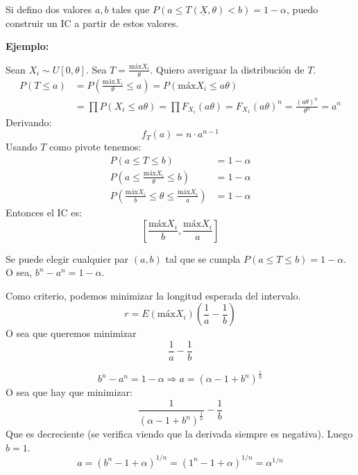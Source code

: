 \begin{enumerate}
		Si defino dos valores $a,b$ tales que $P(a \leq T(\underline X, \theta) < b) = 1-\alpha$, puedo construir un IC a partir de estos valores.

		\textbf{Ejemplo:}

		Sean $X_i\sim U[0,\theta]$. Sea $T = \frac{\text{máx}X_i}{\theta}$.
		Quiero averiguar la distribución de $T$.
		\begin{align*}
			P(T \leq a)	& = P\left(\frac{\text{máx}X_i}{\theta} \leq a\right) = P(\text{máx}X_i \leq a\theta)	\\
						& = \prod P(X_i \leq a\theta) = \prod F_{X_i}(a\theta) = F_{X_1}(a\theta)^n = \frac{(a\theta)^n}{\theta^n} = a^n
		\end{align*}
		Derivando:
		$$f_T(a) = n \cdot a^{n-1}$$
		Usando $T$ como pivote tenemos:
		\begin{align*}
			P(a\leq T \leq b)	& = 1-\alpha	\\
			P\left(a\leq \frac{\text{máx}X_i}{\theta}\leq b\right)	& = 1-\alpha	\\
			P\left(\frac{\text{máx}X_i}{b}\leq \theta\leq \frac{\text{máx}X_i}{a}\right)	& = 1-\alpha
		\end{align*}
		Entonces el IC es:
		$$\left[\frac{\text{máx}X_i}{b}, \frac{\text{máx}X_i}{a}\right]$$

		Se puede elegir cualquier par $(a,b)$ tal que se cumpla $P(a\leq T \leq b) = 1-\alpha$. O sea, $b^n - a^n = 1 - \alpha$.

		Como criterio, podemos minimizar la longitud esperada del intervalo.
		$$r = E(\text{máx} X_i) \left(\frac{1}{a} - \frac{1}{b}\right)$$
		O sea que queremos minimizar $$\frac{1}{a} - \frac{1}{b}$$

		$$b^n - a^n = 1 - \alpha\Rightarrow a = (\alpha - 1 +b^n)^{\frac{1}{n}}$$
		O sea que hay que minimizar:
		$$\frac{1}{(\alpha - 1 + b^n)^{\frac{1}{n}}} - \frac{1}{b}$$
		Que es decreciente (se verifica viendo que la derivada siempre es negativa). Luego $b=1$.
		$$a = (b^n - 1 + \alpha)^{1/n} = (1^n - 1 + \alpha)^{1/n} = \alpha^{1/n}$$
\end{enumerate}
